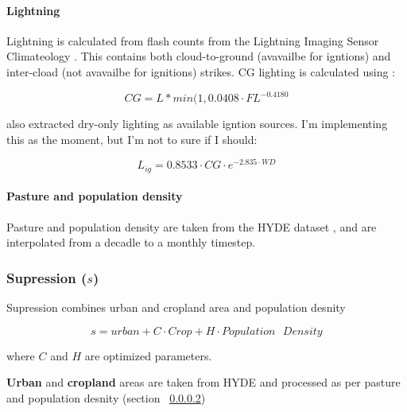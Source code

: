 \paragraph{Lightning}

Lightning is calculated from flash counts
from the Lightning Imaging Sensor Climateology \citep[LIS][http://grip.nsstc.nasa.gov/]{christian1999optical, christian1999lightning}. 
This contains both cloud-to-ground (avavailbe for igntions) and inter-cload (not avavailbe for ignitions) strikes.
CG lighting is calculated using \citet{kelley2014improved}:

\begin{equation}
    CG = L * min(1, 0.0408 \cdot FL^{-0.4180}
\end{equation}

\begin{shaded}
\citet{kelley2014improved} also extracted dry-only lighting as available igntion sources. I'm implementing this as the moment, but I'm not to sure if I should:

\begin{equation}
    L_{ig} = 0.8533 \cdot CG \cdot e^{-2.835 \cdot WD}
\end{equation}
\end{shaded}

\paragraph{Pasture and population density}
\label{Pasture}
Pasture and population density are taken from the HYDE dataset \citep{klein2007mapping}, and are interpolated from a decadle to a monthly timestep.

\subsubsection{Supression ($s$)}

Supression combines urban and cropland area and population desnity

\begin{equation}
    s = urban + C \cdot Crop + H \cdot Population\text{ }Density
    \label{equ:Supression}
\end{equation}

where $C$ and $H$ are optimized parameters.

\textbf{Urban} and \textbf{cropland} areas are taken from HYDE and processed as per pasture and population desnity (section ~\ref{Pasture})


